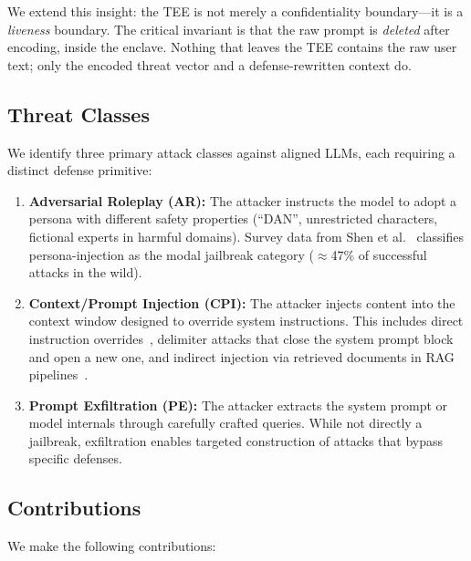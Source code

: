 \documentclass[sigconf,natbib=false]{acmart}
\begin{document}
We extend this insight: the TEE is not merely a confidentiality boundary—it
is a \emph{liveness} boundary. The critical invariant is that the raw prompt
is \emph{deleted} after encoding, inside the enclave. Nothing that leaves the
TEE contains the raw user text; only the encoded threat vector and a
defense-rewritten context do.

\subsection{Threat Classes}
\label{sec:intro:threats}

We identify three primary attack classes against aligned LLMs, each requiring
a distinct defense primitive:

\begin{enumerate}
\item \textbf{Adversarial Roleplay (AR):} The attacker instructs the model to
adopt a persona with different safety properties (``DAN'', unrestricted
characters, fictional experts in harmful domains). Survey data from
Shen et al.~\cite{shen2023anything} classifies persona-injection as the
modal jailbreak category ($\approx$47\% of successful attacks in the wild).

\item \textbf{Context/Prompt Injection (CPI):} The attacker injects content
into the context window designed to override system instructions. This
includes direct instruction overrides~\cite{perez2022ignore}, delimiter
attacks that close the system prompt block and open a new one, and indirect
injection via retrieved documents in RAG pipelines~\cite{greshake2023youve}.

\item \textbf{Prompt Exfiltration (PE):} The attacker extracts the system
prompt or model internals through carefully crafted queries. While not
directly a jailbreak, exfiltration enables targeted construction of
attacks that bypass specific defenses.
\end{enumerate}

\subsection{Contributions}
\label{sec:intro:contributions}

We make the following contributions:
\end{document}

